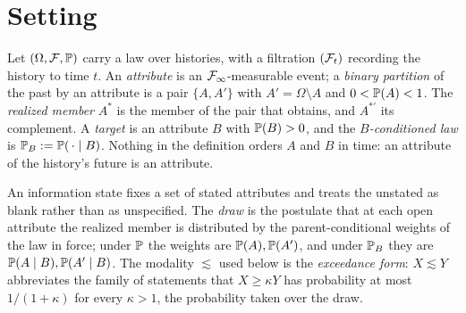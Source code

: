 \section{Setting}\label{sec:setting}

\begin{definition}
\label{def:setting}
Let $(\Omega,\mathcal{F},\mathbb{P})$ carry a law over histories, with a filtration
$(\mathcal{F}_t)$ recording the history to time $t$. An \emph{attribute} is an
$\mathcal{F}_\infty$-measurable event; a \emph{binary partition} of the past by
an attribute is a pair $\{A,A'\}$ with $A'=\Omega\setminus A$ and
$0<\mathbb{P}(A)<1$. The \emph{realized member} $A^\ast$ is the member of the
pair that obtains, and $A^{\ast\prime}$ its complement. A \emph{target} is
an attribute $B$ with $\mathbb{P}(B)>0$, and the \emph{$B$-conditioned law} is
$\mathbb{P}_B:=\mathbb{P}(\,\cdot\mid B)$. Nothing in the definition orders $A$ and $B$
in time: an attribute of the history's future is an attribute.
\end{definition}

\begin{definition}
\label{def:draw}
An information state fixes a set of stated attributes and treats the
unstated as blank rather than as unspecified. The \emph{draw} is the
postulate that at each open attribute the realized member is distributed
by the parent-conditional weights of the law in force; under $\mathbb{P}$ the
weights are $\mathbb{P}(A),\mathbb{P}(A')$, and under $\mathbb{P}_B$ they are
$\mathbb{P}(A\mid B),\mathbb{P}(A'\mid B)$. The modality $\lesssim$ used below is the
\emph{exceedance form}: $X\lesssim Y$ abbreviates the family of statements
that $X\ge\kappa Y$ has probability at most $1/(1+\kappa)$ for every
$\kappa>1$, the probability taken over the draw.
\end{definition}

